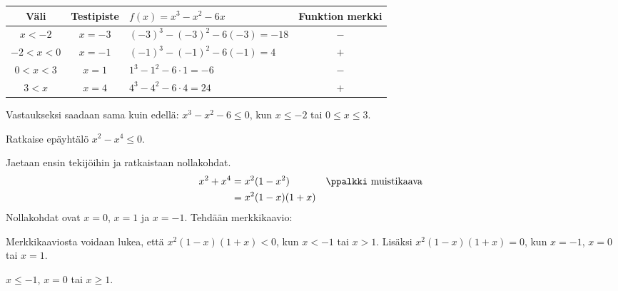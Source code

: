 \begin{tabular}{c|c|l|c}
Väli & Testipiste & $f(x)=x^3-x^2-6x$ & Funktion merkki \\
\hline
$x < -2$ & $x = -3$ & $(-3)^3 -(-3)^2 - 6(-3) = -18$ & $-$ \\
$-2 <x < 0$ & $x = -1$ & $(-1)^3 -(-1)^2 - 6(-1) =4$ & $+$ \\
$0 <x < 3$ & $x = 1$ & $1^3 -1^2 - 6\cdot 1 =  -6$ & $-$ \\
$3 <x $ & $x = 4$ & $4^3 -4^2 - 6\cdot 4 = 24$ & $+$
\end{tabular}

Vastaukseksi saadaan sama kuin edellä: $x^3-x^2-6 \leq 0$, kun $x\leq -2$ tai $0\leq x \leq 3$.

\begin{esimerkki}
Ratkaise epäyhtälö $x^2-x^4 \leq 0$.
\begin{esimratk}
Jaetaan ensin tekijöihin ja ratkaistaan nollakohdat.
\begin{align*}
x^2+x^4 &=x^2(1-x^2) && \ppalkki \text{ muistikaava }\\
&= x^2(1-x)(1+x) 
\end{align*}
Nollakohdat ovat $x=0$, $x=1$ ja $x=-1$. Tehdään merkkikaavio:
\begin{center}
    \begin{merkkikaavio}{3}

        \merkkikaavioMerkki{$+$}
        \merkkikaavioMerkki{$+$}
        \merkkikaavioMerkki{$+$}
        \merkkikaavioMerkki{$+$}

        \merkkikaavioUusirivi
        \merkkikaavioMerkki{$+$}
        \merkkikaavioMerkki{$+$}
        \merkkikaavioMerkki{$+$}
        \merkkikaavioMerkki{$-$}

        \merkkikaavioUusirivi
        \merkkikaavioMerkki{$-$}
        \merkkikaavioMerkki{$+$}
        \merkkikaavioMerkki{$+$}
        \merkkikaavioMerkki{$+$}

        \merkkikaavioUusiriviKaksoisviiva
        \merkkikaavioMerkki{$-$}
        \merkkikaavioMerkki{$+$}
        \merkkikaavioMerkki{$+$}
        \merkkikaavioMerkki{$-$}
    \end{merkkikaavio}
\end{center}
Merkkikaaviosta voidaan lukea, että $x^2(1-x)(1+x) <0$, kun
$x < -1$ tai $x >1$. Lisäksi $x^2(1-x)(1+x)=0$, kun $x=-1$,
$x=0$ tai $x=1$.
\end{esimratk}
\begin{esimvast}
$x \leq -1$, $x=0$ tai $x \geq 1$.
\end{esimvast}
\end{esimerkki}

